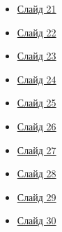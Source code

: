 \begin{frame}[label=tableslide,noframenumbering,plain]
\begin{columns}[T]
	\begin{column}{0.2\textwidth} %
		\begin{itemize}
			\item \hyperlink{slide21}{Слайд 21} %
			\item \hyperlink{slide22}{Слайд 22} %
			\item \hyperlink{slide23}{Слайд 23} %
			\item \hyperlink{slide24}{Слайд 24} %
			\item \hyperlink{slide25}{Слайд 25} %
			\item \hyperlink{slide26}{Слайд 26} %
			\item \hyperlink{slide27}{Слайд 27} %
			\item \hyperlink{slide28}{Слайд 28} %
			\item \hyperlink{slide29}{Слайд 29} %
			\item \hyperlink{slide30}{Слайд 30} %
		\end{itemize}
	\end{column}
	

\end{columns}
\end{frame}
